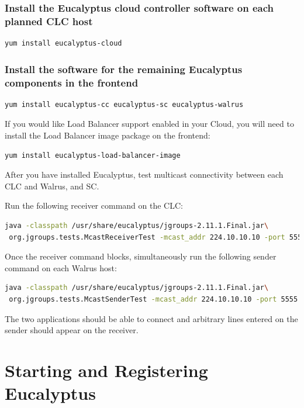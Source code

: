 \subsection{Install the Eucalyptus cloud controller software on each planned CLC host}
\begin{lstlisting}[language=bash]
yum install eucalyptus-cloud
\end{lstlisting}
\subsection{Install the software for the remaining Eucalyptus components in the frontend}
\begin{lstlisting}[language=bash]
yum install eucalyptus-cc eucalyptus-sc eucalyptus-walrus
\end{lstlisting}
If you would like Load Balancer support enabled in your Cloud, you will need to install the Load Balancer image package on the frontend:
\begin{lstlisting}[language=bash]
yum install eucalyptus-load-balancer-image
\end{lstlisting}

After you have installed Eucalyptus, test multicast connectivity between each CLC and Walrus, and SC.
\\ \linebreak

Run the following receiver command on the CLC:
\begin{lstlisting}[language=bash]
java -classpath /usr/share/eucalyptus/jgroups-2.11.1.Final.jar\
 org.jgroups.tests.McastReceiverTest -mcast_addr 224.10.10.10 -port 5555
\end{lstlisting}

Once the receiver command blocks, simultaneously run the following sender command on each Walrus host:
\begin{lstlisting}[language=bash]
java -classpath /usr/share/eucalyptus/jgroups-2.11.1.Final.jar\
 org.jgroups.tests.McastSenderTest -mcast_addr 224.10.10.10 -port 5555
\end{lstlisting}

The two applications should be able to connect and arbitrary lines entered on the sender should appear on the receiver.

\chapter{Starting and Registering Eucalyptus}

